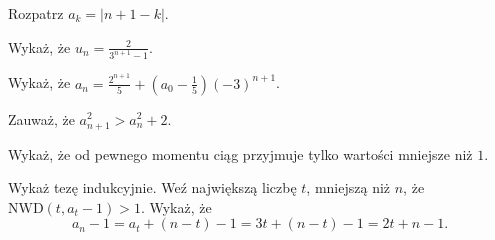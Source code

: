 
\begin{hints_list}
	\item *
	\item Rozpatrz $a_k = |n + 1 - k|$.
	\item Wykaż, że $u_n =  \frac{2}{3^{n + 1} - 1}$.
	\item Wykaż, że $a_n = \frac{2^{n + 1}}{5} +\left(a_0 - \frac{1}{5}\right)(-3)^{n + 1}$.
	\item Zauważ, że $a_{n + 1}^2 > a_n^2 + 2$.
	\item Wykaż, że od pewnego momentu ciąg przyjmuje tylko wartości mniejsze niż $1$.
	\item Wykaż tezę indukcyjnie. Weź największą liczbę $t$, mniejszą niż $n$, że $\mathrm{NWD}(t, a_t − 1) > 1$. Wykaż, że
	\[
		a_n − 1 = a_t + (n − t) − 1 = 3t + (n - t) - 1 =  2t + n − 1.
	\]
\end{hints_list}